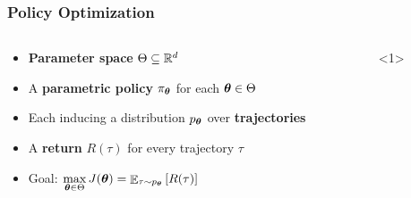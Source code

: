 \documentclass[aspectratio=169, table]{beamer}
\newcommand{\enb}[1]{\textcolor{poliblue1}{\textbf{#1}}}
\begin{document}
\begin{frame}
\frametitle{Policy Optimization} 
\begin{columns}
\begin{column}{.65\textwidth}
\begin{overlayarea}{\textwidth}{\textheight}
\begin{itemize}
	\setlength{\itemsep}{25pt}
	\item \enb{Parameter space} $\Theta \subseteq \mathbb{R}^d$
	\item<2-> A \enb{parametric policy} $\pi_{\boldsymbol{\theta}}$ for each $\boldsymbol{\theta}\in\Theta$
	\item<3-> Each inducing a distribution $p_{\boldsymbol{\theta}}$ over \enb{trajectories}
	\item<4-> A \enb{return} $R(\tau)$ for every trajectory $\tau$
	\item<5-> {Goal: $\max\limits_{\boldsymbol{\theta}\in\Theta} J(\boldsymbol{\theta}) = \mathop{\mathbb{E}}_{\tau\sim p_{\boldsymbol{\theta}}}\left[R(\tau)\right]$}
\end{itemize}
\end{overlayarea}
\end{column}
\begin{column}{.35\textwidth}
\begin{overlayarea}{\textwidth}{\textheight}
	\only{
}
\end{overlayarea}
\end{column}
\end{columns}
\end{frame}
\end{document}
